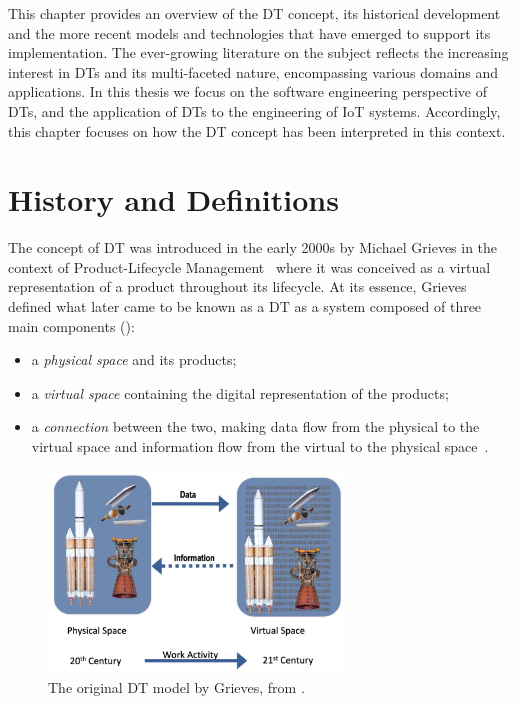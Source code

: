 This chapter provides an overview of the \ac{DT} concept,
its historical development and the more recent models and technologies that have emerged
to support its implementation.
%
The ever-growing literature on the subject reflects the increasing interest in \acp{DT}
and its multi-faceted nature, encompassing various domains and applications.
%
In this thesis we focus on the software engineering perspective of \acp{DT}, 
and the application of \acp{DT} to the engineering of \ac{IoT} systems.
%
Accordingly, this chapter focuses on how the \ac{DT} concept has been interpreted in this context.


\section{History and Definitions}

The concept of \ac{DT} was introduced in the early 2000s by Michael Grieves
in the context of Product-Lifecycle Management~\cite{Grieves_2023}
where it was conceived as a virtual representation of a product throughout its lifecycle.
%
At its essence, Grieves defined what later came to be known as a \ac{DT} as a system composed of three main components ():
\begin{itemize}
\item a \emph{physical space} and its products;
\item a \emph{virtual space} containing the digital representation of the products;
\item a \emph{connection} between the two, making data flow from the physical to the virtual space and information flow from the virtual to the physical space~\cite{Grieves2017}.
\end{itemize}

\begin{figure}[t]
    \centering
    \includegraphics[width=0.7\textwidth]{figures/dt-original.png}
    \caption{The original \ac{DT} model by Grieves, from \cite{Grieves_2022}.}
    \label{fig:dt-grieves-original}
\end{figure}


